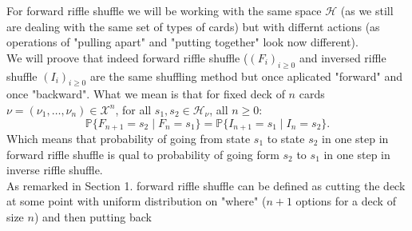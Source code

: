 \documentclass[a4paper, 12pt]{report}
\begin{document}
For forward riffle shuffle we will be working with the same space $\mathcal{H}$ (as we still 
are dealing with the same set of types of cards) but with differnt actions (as operations of "pulling apart" 
and "putting together" look now different). \\
We will proove that indeed forward riffle shuffle ($(F_i)_{i \geq 0}$ and inversed riffle shuffle 
$(I_i)_{i \geq 0}$ are the same shuffling method 
but once aplicated "forward" and once "backward". What we mean is that for fixed deck of $n$ cards 
$\nu = (\nu_1, \dots, \nu_n) \in \mathcal{X}^n$, for all $s_1, s_2 \in \mathcal{H}_\nu$, all $n \geq 0$:
\begin{equation*}
\mathbb{P}\{F_{n+1} = s_2 \mid F_n = s_1\} = \mathbb{P}\{I_{n+1} = s_1 \mid I_n = s_2\}.
\end{equation*} 
Which means that probability of going from state $s_1$ to state $s_2$ in one step in forward riffle shuffle 
is qual to probability of going form $s_2$ to $s_1$ in one step in  inverse riffle shuffle. \\
As remarked in Section 1. forward riffle shuffle can be defined as cutting the deck at some point with 
uniform distribution on "where" ($n+1$ options for a deck of size $n$) and then putting back 
\end{document}
